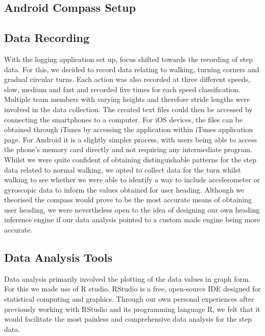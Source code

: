 \documentclass[main.tex]{subfiles}
\begin{document}
\subsection{Android Compass Setup}

\subsection{Data Recording}

With the logging application set up, focus shifted towards the recording of step data. For this, we decided to record data relating to walking, turning corners and gradual circular turns. Each action was also recorded at three different speeds, slow, medium and fast and recorded five times for each speed classification. Multiple team members with varying heights and therefore stride lengths were involved in the data collection. The created text files could then be accessed by connecting the smartphones to a computer. For iOS devices, the files can be obtained through iTunes by accessing the application within iTunes application page. For Android it is a slightly simpler process, with users being able to access the phone's memory card directly and not requiring any intermediate program.\\

Whilst we were quite confident of obtaining distinguishable patterns for the step data related to normal walking, we opted to collect data for the turn whilst walking to see whether we were able to identify a way to include accelerometer or gyroscopic data to inform the values obtained for user heading. Although we theorised the compass would prove to be the most accurate means of obtaining user heading, we were nevertheless open to the idea of designing our own heading inference engine if our data analysis pointed to a custom made engine being more accurate.\\

\subsection{Data Analysis Tools}

Data analysis primarily involved the plotting of the data values in graph form. For this we made use of R studio. RStudio is a free, open-source IDE designed for statistical computing and graphics. Through our own personal experiences after previously working with RStudio and its programming language R, we felt that it would facilitate the most painless and comprehensive data analysis for the step data.\\
\end{document}
